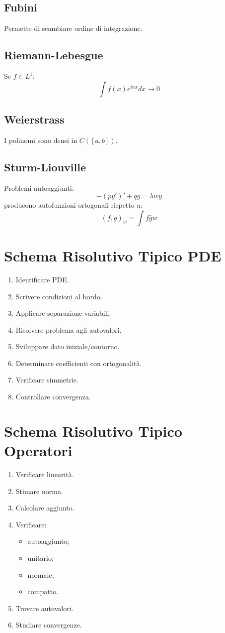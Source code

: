 \documentclass[a4paper,10pt]{article}
\begin{document}
\subsection{Fubini}
Permette di scambiare ordine di integrazione.
\subsection{Riemann-Lebesgue}
Se $f\in L^1$:
\[\int f(x)e^{inx}dx\to0\]
\subsection{Weierstrass}
I polinomi sono densi in $C([a,b])$.
\subsection{Sturm-Liouville}
Problemi autoaggiunti:
\[-(py')'+qy=\lambda wy\]
producono autofunzioni ortogonali rispetto a:
\[(f,g)_w=\int f\bar g w\]
\section{Schema Risolutivo Tipico PDE}
\begin{enumerate}
\item Identificare PDE.
\item Scrivere condizioni al bordo.
\item Applicare separazione variabili.
\item Risolvere problema agli autovalori.
\item Sviluppare dato iniziale/contorno.
\item Determinare coefficienti con ortogonalità.
\item Verificare simmetrie.
\item Controllare convergenza.
\end{enumerate}
\section{Schema Risolutivo Tipico Operatori}
\begin{enumerate}
\item Verificare linearità.
\item Stimare norma.
\item Calcolare aggiunto.
\item Verificare:
\begin{itemize}
\item autoaggiunto;
\item unitario;
\item normale;
\item compatto.
\end{itemize}
\item Trovare autovalori.
\item Studiare convergenze.
\end{enumerate}
\end{document}
